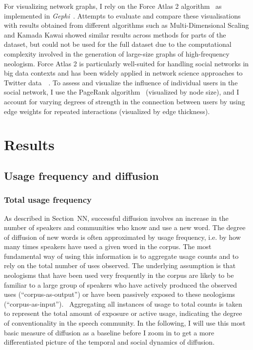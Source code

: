 \documentclass[
  a4paper,
  abstract=on,
  captions=tableabove
  ]{scrartcl}
\begin{document}
  For visualizing network graphs, I rely on the Force Atlas 2 algorithm~\parencite{Jacomy2014ForceAtlas2Continuous} as implemented in \emph{Gephi}~\parencite{Bastian2009GephiOpen}. Attempts to evaluate and compare these visualisations with results obtained from different algorithms such as Multi-Dimensional Scaling and Kamada Kawai showed similar results across methods for parts of the dataset, but could not be used for the full dataset due to the computational complexity involved in the generation of large-size graphs of high-frequency neologism. Force Atlas 2 is particularly well-suited for handling social networks in big data contexts and has been widely applied in network science approaches to Twitter data~ \parencite{Bruns2012HowLong,Gerlitz2013MiningOne,Bliss2012TwitterReciprocal}. To assess and visualize the influence of individual users in the social network, I use the PageRank algorithm~\parencite{Brin1998AnatomyLargeScale} (visualized by node size), and I account for varying degrees of strength in the connection between users by using edge weights for repeated interactions (visualized by edge thickness).

\section{Results}
  \label{sec:results}

  \subsection{Usage frequency and diffusion}
    \label{subsec:freq}

    \subsubsection{Total usage frequency}
      \label{subsec:total-freq}

      As described in Section~NN, successful diffusion involves an increase in the number of speakers and communities who know and use a new word. The degree of diffusion of new words is often approximated by usage frequency, i.e. by how many times speakers have used a given word in the corpus. The most fundamental way of using this information is to aggregate usage counts and to rely on the total number of uses observed. The underlying assumption is that neologisms that have been used very frequently in the corpus are likely to be familiar to a large group of speakers who have actively produced the observed uses (\enquote{corpus-as-output}) or have been passively exposed to these neologisms (\enquote{corpus-as-input}).~\parencite{Stefanowitsch2017CorpusbasedPerspective} Aggregating all instances of usage to total counts is taken to represent the total amount of exposure or active usage, indicating the degree of conventionality in the speech community. In the following, I will use this most basic measure of diffusion as a baseline before I zoom in to get a more differentiated picture of the temporal and social dynamics of diffusion.
\end{document}
